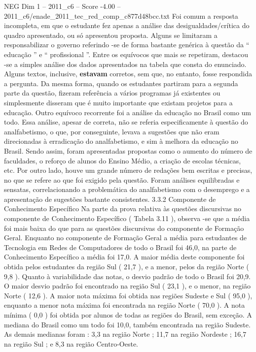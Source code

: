 \begin{textsample}{NEG Dim 1 – 2011\_c6 – Score -4.00 – 2011\_c6/enade\_2011\_tec\_red\_comp\_c877d48bcc.txt}
Foi comum a resposta incompleta, em que o estudante fez apenas a análise das desigualdades/crítica do quadro apresentado, ou só apresentou proposta.
Alguns se limitaram a responsabilizar o governo referindo -se de forma bastante genérica à questão da “ educação ” e “ profissional ”.
Entre os equívocos que mais se repetiram, destacou -se a simples análise dos dados apresentados na tabela que consta do enunciado.
Alguns textos, inclusive, \textbf{estavam} corretos, sem que, no entanto, fosse respondida a pergunta.
Da mesma forma, quando os estudantes partiram para a segunda parte da questão, fizeram referência a vários programas já existentes ou simplesmente disseram que é muito importante que existam projetos para a educação.
Outro equívoco recorrente foi a análise da educação no Brasil como um todo.
Essa análise, apesar de correta, não se referia especificamente à questão do analfabetismo, o que, por conseguinte, levava a sugestões que não eram direcionadas à erradicação do analfabetismo, e sim à melhora da educação no Brasil.
Sendo assim, foram apresentadas propostas como o aumento do número de faculdades, o reforço de alunos do Ensino Médio, a criação de escolas técnicas, etc.
Por outro lado, houve um grande número de redações bem escritas e precisas, no que se refere ao que foi exigido pela questão.
Foram análises equilibradas e sensatas, correlacionando a problemática do analfabetismo com o desemprego e a apresentação de sugestões bastante consistentes. 3.3.2 Componente de Conhecimento Específico Na parte da prova relativa às questões discursivas no componente de Conhecimento Específico ( Tabela 3.11 ), observa -se que a média foi mais baixa do que para as questões discursivas do componente de Formação Geral.
Enquanto no componente de Formação Geral a média para estudantes de Tecnologia em Redes de Computadores de todo o Brasil foi 46,0, na parte de Conhecimento Específico a média foi 17,0.
A maior média deste componente foi obtida pelos estudantes da região Sul ( 21,7 ), e a menor, pelos da região Norte ( 9,8 ).
Quanto à variabilidade das notas, o desvio padrão de todo o Brasil foi 20,9.
O maior desvio padrão foi encontrado na região Sul ( 23,1 ), e o menor, na região Norte ( 12,6 ).
A maior nota máxima foi obtida nas regiões Sudeste e Sul ( 95,0 ), enquanto a menor nota máxima foi encontrada na região Norte ( 70,0 ).
A nota mínima ( 0,0 ) foi obtida por alunos de todas as regiões do Brasil, sem exceção.
A mediana do Brasil como um todo foi 10,0, também encontrada na região Sudeste.
As demais medianas foram : 3,3 na região Norte ; 11,7 na região Nordeste ; 16,7 na região Sul ; e 8,3 na região Centro-Oeste.

\end{textsample}
